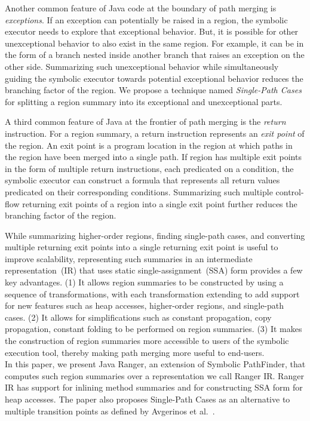Another common feature of Java code at the boundary of path merging is \textit{exceptions}.
%
If an exception can potentially be raised in a region, the symbolic executor needs to explore that exceptional behavior.
%
But, it is possible for other unexceptional behavior to also exist in the same region.
%
For example, it can be in the form of a branch nested inside another branch that raises an exception on the other side.
%
Summarizing such unexceptional behavior while simultaneously guiding the symbolic executor towards potential exceptional
behavior reduces the branching factor of the region.
%
We propose a technique named \textit{Single-Path Cases} for splitting a region summary into its exceptional and
unexceptional parts.

A third common feature of Java at the frontier of path merging is the \textit{return} instruction.
%
For a region summary, a return instruction represents an \textit{exit point} of the region.
%
An exit point is a program location in the region at which paths in the region have been merged into a single path.
%
If region has multiple exit points in the form of multiple return instructions, each predicated on a condition, the symbolic
executor can construct a formula that represents all return values predicated on their corresponding conditions.
%
Summarizing such multiple control-flow returning exit points of a region into a single exit point further
reduces the branching factor of the region.

While summarizing higher-order regions, finding single-path cases, and converting multiple returning exit points into a
single returning exit point is useful to improve scalability, representing such summaries in an intermediate
representation~(IR) that uses static single-assignment~(SSA) form provides a few key advantages.
%
(1) It allows region summaries to be constructed by using a sequence of transformations, with each transformation
extending to add support for new features such as heap accesses, higher-order regions, and single-path cases.
%
(2) It allows for simplifications such as constant propagation, copy propagation, constant folding to be performed on
region summaries.
%
(3) It makes the construction of region summaries more accessible to users of the symbolic execution tool, thereby making
path merging more useful to end-users.\\
%
In this paper, we present Java Ranger, an extension of Symbolic PathFinder, that computes such region summaries over a representation we call
Ranger IR.
%
Ranger IR has support for inlining method summaries and for constructing SSA form for heap accesses.
%
The paper also proposes Single-Path Cases as an alternative to multiple transition points as
defined by Avgerinos et al.~\cite{veritesting}.

